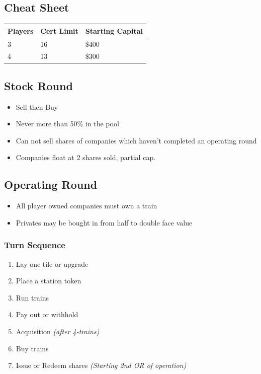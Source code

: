 \documentclass[letterpaper]{article}
\begin{document}
\begin{multicols}{2}
    \section*{Cheat Sheet}
    \begin{tabular}{l|l|l}
      \hline
      \textbf{Players} & \textbf{Cert Limit} & \textbf{Starting Capital} \\
      \hline
      \hline
      3 & 16 & \$400 \\
      4 & 13 & \$300 \\
      \hline
    \end{tabular}
    \subsection*{Stock Round}
    \begin{itemize}
    \item Sell then Buy
    \item Never more than 50\% in the pool
    \item Can not sell shares of companies which haven't completed an operating round
    \item Companies float at 2 shares sold, partial cap.
    \end{itemize}
    \subsection*{Operating Round}

    \begin{itemize}
    \item All player owned companies must own a train
    \item Privates may be bought in from half to double face value
    \end{itemize}

    \subsubsection*{Turn Sequence}
    \begin{enumerate}
    \item Lay one tile or upgrade
    \item Place a station token
    \item Run trains
    \item Pay out or withhold
    \item Acquisition \textit{(after 4-trains)}
    \item Buy trains
    \item Issue or Redeem shares \textit{(Starting 2nd OR of operation)}
    \end{enumerate}


\end{multicols}
\end{document}
